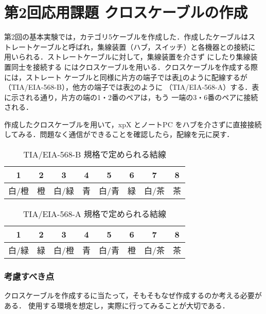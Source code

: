 \section{第2回応用課題 クロスケーブルの作成}

第2回の基本実験では，カテゴリ5ケーブルを作成した．作成したケーブルはス
トレートケーブルと呼ばれ，集線装置（ハブ，スイッチ）と各機器との接続に
用いられる．ストレートケーブルに対して，集線装置を介さず
に\textbf{}したり集線装置同士を接続する
にはクロスケーブルを用いる．クロスケーブルを作成する際には，ストレート
ケーブルと同様に片方の端子では表\ref{tab:T568B}のように配線するが
（TIA/EIA-568-B），他方の端子では表\ref{tab:T568A}のように
（TIA/EIA-568-A）する．表に示される通り，片方の端の1・2番のペアは，もう
一端の3・6番のペアに接続される．

作成したクロスケーブルを用いて，xpX とノートPC をハブを介さずに直接接続
してみる．問題なく通信ができることを確認したら，配線を元に戻す．

\begin{table}[htbp]
\begin{center}
\caption{TIA/EIA-568-B 規格で定められる結線}
\label{tab:T568B}
\begin{tabular}{|c|c|c|c|c|c|c|c|}
\hline
1 & 2 & 3 & 4 & 5 & 6 & 7 & 8 \\ \hline
白/橙 & 橙 & 白/緑 & 青 & 白/青 & 緑 & 白/茶 & 茶 \\
\hline
\end{tabular}
\end{center}
\end{table}

\begin{table}[htbp]
\begin{center}
\caption{TIA/EIA-568-A 規格で定められる結線}
\label{tab:T568A}
\begin{tabular}{|c|c|c|c|c|c|c|c|}
\hline
1 & 2 & 3 & 4 & 5 & 6 & 7 & 8 \\ \hline
白/緑 & 緑 & 白/橙 & 青 & 白/青 & 橙 & 白/茶 & 茶 \\
\hline
\end{tabular}
\end{center}
\end{table}

\subsubsection*{考慮すべき点}
クロスケーブルを作成するに当たって，そもそもなぜ作成するのか考える必要がある．
使用する環境を想定し，実際に行ってみることが大切である．
